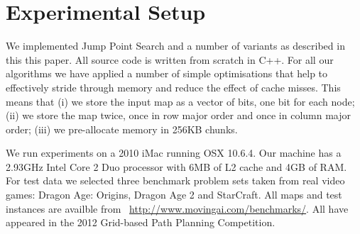 \section{Experimental Setup}
\label{sec::setup}
We implemented Jump Point Search and a number of variants as described
in this this paper. All source code is written from scratch in C++.
For all our algorithms we have applied a number of simple optimisations 
that help to effectively stride through memory and reduce the effect of 
cache misses.
This means that (i) we store the input map as a vector of bits, one bit 
for each node; (ii) we store the map twice, once in row major order and 
once in column major order; (iii) we pre-allocate memory in 256KB chunks.

We run experiments on a 2010 iMac running OSX 10.6.4. Our machine has 
a 2.93GHz Intel Core 2 Duo processor with 6MB of L2 cache and 4GB of RAM.
For test data we selected three benchmark problem sets taken from
real video games: Dragon Age: Origins, Dragon Age 2 and StarCraft.  
All maps and test instances are availble from 
~{\small \url{http://www.movingai.com/benchmarks/}}.
All have appeared in the 2012 Grid-based Path Planning Competition. 
